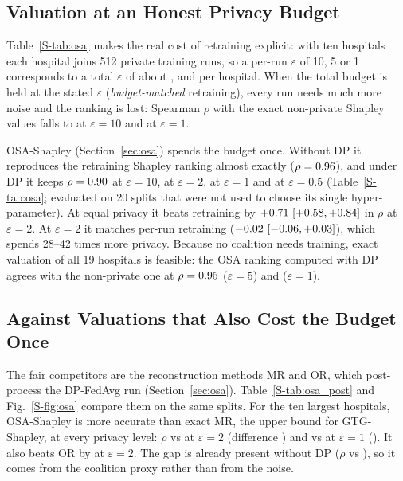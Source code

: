 \subsection{Valuation at an Honest Privacy Budget}
\label{sec:p19_osa}
Table~\ref{S-tab:osa} makes the real cost of retraining explicit: with ten hospitals each hospital joins 512 private training runs, so a per-run $\varepsilon$ of 10, 5 or 1 corresponds to a total $\varepsilon$ of about \trueEpsTen{}, \trueEpsFive{} and \trueEpsOne{} per hospital. When the total budget is held at the stated $\varepsilon$ (\emph{budget-matched} retraining), every run needs much more noise and the ranking is lost: Spearman $\rho$ with the exact non-private Shapley values falls to \bmRhoTen{} at $\varepsilon=10$ and \bmRhoOne{} at $\varepsilon=1$.

OSA-Shapley (Section~\ref{sec:osa}) spends the budget once. Without DP it reproduces the retraining Shapley ranking almost exactly ($\rho=0.96$), and under DP it keeps $\rho=0.90$ at $\varepsilon=10$, \osaRhoTwo{} at $\varepsilon=2$, \osaRhoOne{} at $\varepsilon=1$ and \osaRhoHalf{} at $\varepsilon=0.5$ (Table~\ref{S-tab:osa}; evaluated on 20 splits that were not used to choose its single hyper-parameter). At equal privacy it beats retraining by $+0.71\ [+0.58, +0.84]$ in $\rho$ at $\varepsilon=2$. At $\varepsilon=2$ it matches per-run retraining ($-0.02\ [-0.06, +0.03]$), which spends 28--42 times more privacy. Because no coalition needs training, exact valuation of all 19 hospitals is feasible: the OSA ranking computed with DP agrees with the non-private one at $\rho=0.95$ ($\varepsilon=5$) and \osaNineRhoOne{} ($\varepsilon=1$).


\subsection{Against Valuations that Also Cost the Budget Once}
\label{sec:p19_post}
The fair competitors are the reconstruction methods MR and OR, which post-process the DP-FedAvg run (Section~\ref{sec:osa}). Table~\ref{S-tab:osa_post} and Fig.~\ref{S-fig:osa} compare them on the same splits. For the ten largest hospitals, OSA-Shapley is more accurate than exact MR, the upper bound for GTG-Shapley, at every privacy level: $\rho$ \osaRhoTwo{} vs \mrRhoTwo{} at $\varepsilon=2$ (difference \osaVsMrTwo) and \osaRhoOne{} vs \mrRhoOne{} at $\varepsilon=1$ (\osaVsMrOne). It also beats OR by \osaVsOrTwo{} at $\varepsilon=2$. The gap is already present without DP ($\rho$ \osaNoDP{} vs \mrRhoNoDP), so it comes from the coalition proxy rather than from the noise.


